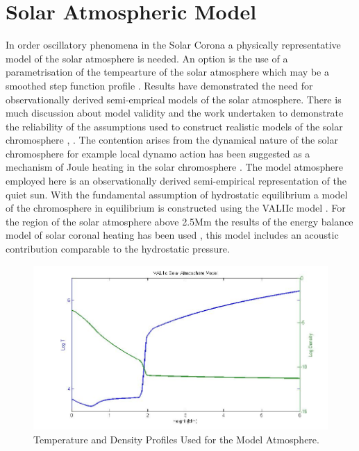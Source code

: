\documentclass[final,1p]{elsarticle}
\begin{document}


\section{Solar Atmospheric Model}
In order oscillatory phenomena in the Solar Corona a physically representative model of the solar atmosphere is needed. An option is the use of a parametrisation of the tempearture of the solar atmosphere which may be a smoothed step function profile  \cite{Murawski2010}. Results have demonstrated the need for observationally derived semi-emprical models of the solar atmosphere. There is much discussion about model validity and the work undertaken to demonstrate the reliability of the assumptions used to construct realistic models of the solar chromosphere \cite{Carlsson1995}, \cite{Kalkofen2012}. The contention arises from the dynamical nature of the solar chromosphere for example local dynamo action has been suggested as a mechanism of Joule heating in the solar chromosphere \cite{Leenaarts2011}. The model atmosphere employed here is an observationally derived semi-empirical representation of the quiet sun. With the fundamental assumption of hydrostatic equilibrium a model of the chromosphere in equilibrium is constructed using the VALIIc model \cite{Vernazza1981}. For the region of the solar atmosphere above 2.5Mm the results of the energy balance model of solar coronal heating has been used  \cite{McWhirter1975}, this model includes an acoustic contribution comparable to the hydrostatic pressure.




\begin{figure}[h]
\includegraphics[scale=0.5]{images/VAL3C_rho_temp_fig2.jpg}
\caption{Temperature and Density Profiles Used for the Model Atmosphere. }
\end{figure}
\end{document}
